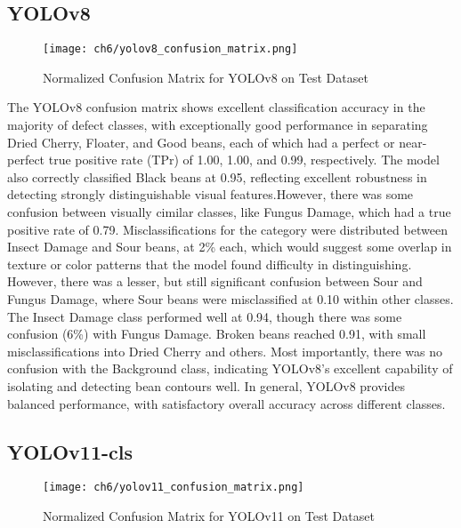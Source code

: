 \subsection{YOLOv8}

\begin{figure}[H]
    \centering
    \texttt{[image: ch6/yolov8\_confusion\_matrix.png]} %
    \caption{Normalized Confusion Matrix for YOLOv8 on Test Dataset}
    \label{fig:yolov8_conf_matrix}
\end{figure}

The YOLOv8 confusion matrix shows excellent classification accuracy in the majority of defect classes, with exceptionally good performance in separating Dried Cherry, Floater, and Good beans, each of which had a perfect or near-perfect true positive rate (TPr) of 1.00, 1.00, and 0.99, respectively. The model also correctly classified Black beans at 0.95, reflecting excellent robustness in detecting strongly distinguishable visual features.However, there was some confusion between visually cimilar classes, like Fungus Damage, which had a true positive rate of 0.79. Misclassifications for the category were distributed between Insect Damage and Sour beans, at 2\% each, which would suggest some overlap in texture or color patterns that the model found difficulty in distinguishing. However, there was a lesser, but still significant confusion between Sour and Fungus Damage, where Sour beans were misclassified at 0.10 within other classes. The Insect Damage class performed well at 0.94, though there was some confusion (6\%) with Fungus Damage. Broken beans reached 0.91, with small misclassifications into Dried Cherry and others. Most importantly, there was no confusion with the Background class, indicating YOLOv8's excellent capability of isolating and detecting bean contours well. In general, YOLOv8 provides balanced performance, with satisfactory overall accuracy across different classes. 

\subsection{YOLOv11-cls}

\begin{figure}[H]
    \centering
    \texttt{[image: ch6/yolov11\_confusion\_matrix.png]} %
    \caption{Normalized Confusion Matrix for YOLOv11 on Test Dataset}
    \label{fig:yolov11_conf_matrix}
\end{figure}

